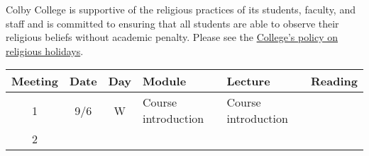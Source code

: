 \documentclass[]{article}
\begin{document}
Colby College is supportive of the religious practices of its students,
faculty, and staff and is committed to ensuring that all students are
able to observe their religious beliefs without academic penalty. Please
see the
\href{http://www.colby.edu/spirituallife/religious-holidays/}{College's
policy on religious holidays}.

\begin{longtable}[]{@{}ccclll@{}}
\toprule
\begin{minipage}[b]{0.13\columnwidth}\centering\strut
Meeting\strut
\end{minipage} & \begin{minipage}[b]{0.08\columnwidth}\centering\strut
Date\strut
\end{minipage} & \begin{minipage}[b]{0.07\columnwidth}\centering\strut
Day\strut
\end{minipage} & \begin{minipage}[b]{0.10\columnwidth}\raggedright\strut
Module\strut
\end{minipage} & \begin{minipage}[b]{0.12\columnwidth}\raggedright\strut
Lecture\strut
\end{minipage} & \begin{minipage}[b]{0.12\columnwidth}\raggedright\strut
Reading\strut
\end{minipage}\tabularnewline
\midrule
\endhead
\begin{minipage}[t]{0.13\columnwidth}\centering\strut
1\strut
\end{minipage} & \begin{minipage}[t]{0.08\columnwidth}\centering\strut
9/6\strut
\end{minipage} & \begin{minipage}[t]{0.07\columnwidth}\centering\strut
W\strut
\end{minipage} & \begin{minipage}[t]{0.10\columnwidth}\raggedright\strut
Course introduction\strut
\end{minipage} & \begin{minipage}[t]{0.12\columnwidth}\raggedright\strut
Course introduction\strut
\end{minipage} & \begin{minipage}[t]{0.12\columnwidth}\raggedright\strut
\strut
\end{minipage}\tabularnewline
\begin{minipage}[t]{0.13\columnwidth}\centering\strut
2\strut
\end{minipage} & \begin{minipage}[t]{0.08\columnwidth}\centering\strut

\end{minipage}
\end{longtable}
\end{document}
